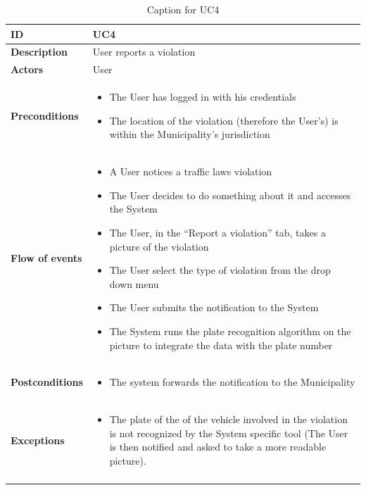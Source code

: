\documentclass {article}
\begin{document}
		\begin{longtable}{| p{3 cm} | p{8.5 cm} |} 
			\hline
			{\bf ID} & UC4 \\
			\hline
			{\bf Description} & User reports a violation \\
			\hline
			{\bf Actors} & User\\
			\hline
			{\bf Preconditions} & \begin{itemize}
								  \item The User has logged in with his credentials
								  \item The location of the violation (therefore the User’s) is within the Municipality’s jurisdiction
								  \end{itemize}	\\
			\hline
			{\bf Flow of events} &	\begin{itemize}
								  \item A User notices a traffic laws violation 
								  \item The User decides to do something about it and accesses the System
								  \item The User, in the “Report a violation” tab, takes a picture of the violation
								  \item The User select the type of violation from the drop down menu
								  \item The User submits the notification to the System
								  \item The System runs the plate recognition algorithm on the picture to integrate the data with the plate number
								  \end{itemize}	\\
			\hline
			{\bf Postconditions} & \begin{itemize}
								  \item The system forwards the notification to the Municipality
								  \end{itemize}	 \\
			\hline
			{\bf Exceptions} & 	\begin{itemize}
								  \item The plate of the of the vehicle involved in the violation is not recognized by the System specific tool (The User is then notified and asked to take a more readable picture).
								  \end{itemize}	\\
			\hline
			\caption{Caption for UC4}
			\end{longtable}
			
\end{document}
